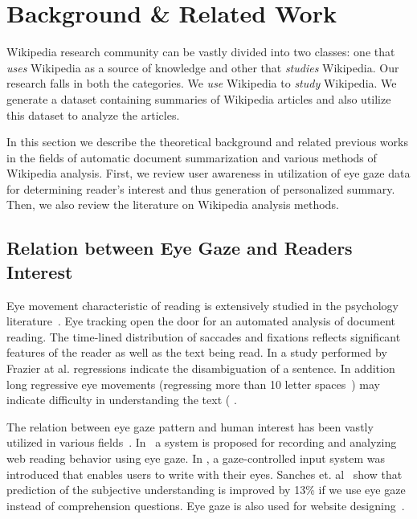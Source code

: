 \documentclass[12pt]{article}
\begin{document}
\section{Background \& Related Work}\label{sec:Related}
Wikipedia research community can be vastly divided into two classes: one that \emph{uses} Wikipedia as a source of knowledge and other that \emph{studies} Wikipedia. Our research falls in both the categories. We \emph{use} Wikipedia to \emph{study} Wikipedia. We generate a dataset containing summaries of Wikipedia articles and also utilize this dataset to analyze the articles.

In this section we describe the theoretical background and related previous works in the fields of automatic document summarization and various methods of Wikipedia analysis. First, we review user awareness in utilization of eye gaze data for determining reader's interest and thus generation of personalized summary. Then, we also review the literature on Wikipedia analysis methods.

\subsection{Relation between Eye Gaze and Readers Interest}
Eye movement characteristic of reading is extensively studied in the psychology literature~\cite{rayner1998eye}. Eye tracking open the door for an automated analysis of document reading. The time-lined distribution of saccades and fixations reflects significant features of the reader as well as the text being read. In a study performed by Frazier at al. \cite{frazier1982making} regressions indicate the disambiguation of a sentence. In addition long regressive eye movements (regressing more than 10 letter spaces~\cite{rayner1998eye}) may indicate difficulty in understanding the text (\cite{frazier1982making} \cite{rayner2012eye}. 

The relation between eye gaze pattern and human interest has been vastly utilized in various fields~\cite{knight2013estimating}. In~\cite{beymer2005webgazeanalyzer} a system is proposed for recording and analyzing web reading behavior using eye gaze. In \cite{bee2008writing}, a gaze-controlled input system was introduced that enables users to write with their eyes. Sanches et. al~\cite{sanches2018estimation} show that prediction of the subjective understanding is improved by 13\% if we use eye gaze instead of comprehension questions. Eye gaze is also used for website designing~\cite{djamasbi2014eye}. 
\end{document}
